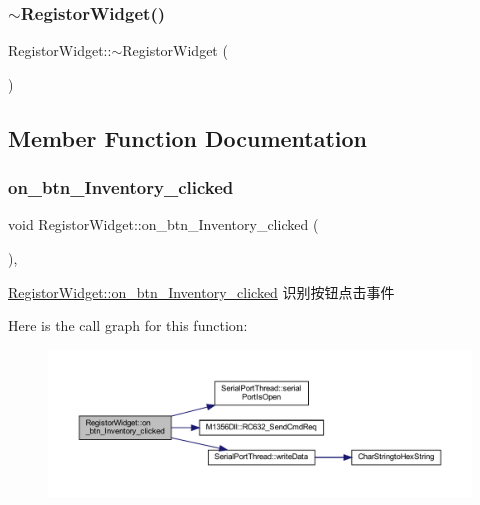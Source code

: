 \mbox{\label{class_registor_widget_a066b7812f556e83709a410e8d092dd8f}} 
\subsubsection{\texorpdfstring{$\sim$RegistorWidget()}{~RegistorWidget()}}
{\footnotesize\ttfamily Registor\+Widget\+::$\sim$\+Registor\+Widget (\begin{DoxyParamCaption}{ }\end{DoxyParamCaption})}



\subsection{Member Function Documentation}
\mbox{\label{class_registor_widget_a4bbc6a6b1f22c708966d79a5947e36b1}} 
\subsubsection{\texorpdfstring{on\_btn\_Inventory\_clicked}{on\_btn\_Inventory\_clicked}}
{\footnotesize\ttfamily void Registor\+Widget\+::on\+\_\+btn\+\_\+\+Inventory\+\_\+clicked (\begin{DoxyParamCaption}{ }\end{DoxyParamCaption})\hspace{0.3cm}{\ttfamily [private]}, {\ttfamily [slot]}}



\mbox{\hyperlink{class_registor_widget_a4bbc6a6b1f22c708966d79a5947e36b1}{Registor\+Widget\+::on\+\_\+btn\+\_\+\+Inventory\+\_\+clicked}} 识别按钮点击事件 

Here is the call graph for this function\+:
\nopagebreak
\begin{figure}[H]
\begin{center}
\leavevmode
\includegraphics[width=350pt]{class_registor_widget_a4bbc6a6b1f22c708966d79a5947e36b1_cgraph}
\end{center}
\end{figure}
\mbox{\label{class_registor_widget_adb55365b88e07391d6e8e7c639c68219}} 

